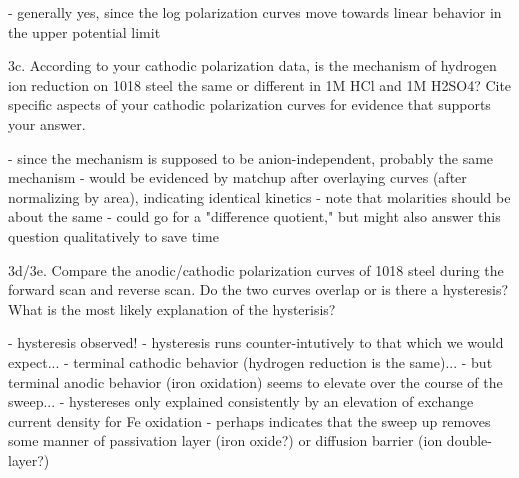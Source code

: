 	- generally yes, since the log polarization curves move towards linear behavior in the upper potential limit

3c. According to your cathodic polarization data, is the mechanism of hydrogen ion reduction on 1018 steel the same or different in 1M HCl and 1M H2SO4?  Cite specific aspects of your cathodic polarization curves for evidence that supports your answer.

	- since the mechanism is supposed to be anion-independent, probably the same mechanism
	- would be evidenced by matchup after overlaying curves (after normalizing by area), indicating identical kinetics
	- note that molarities should be about the same
	- could go for a "difference quotient," but might also answer this question qualitatively to save time

3d/3e. Compare the anodic/cathodic polarization curves of 1018 steel during the forward scan and reverse scan.  Do the two curves overlap or is there a hysteresis?  What is the most likely explanation of the hysterisis?

	- hysteresis observed!
	- hysteresis runs counter-intutively to that which we would expect...
	- terminal cathodic behavior (hydrogen reduction is the same)...
	- but terminal anodic behavior (iron oxidation) seems to elevate over the course of the sweep...
	- hystereses only explained consistently by an elevation of exchange current density for Fe oxidation
	- perhaps indicates that the sweep up removes some manner of passivation layer (iron oxide?) or diffusion barrier (ion double-layer?)
